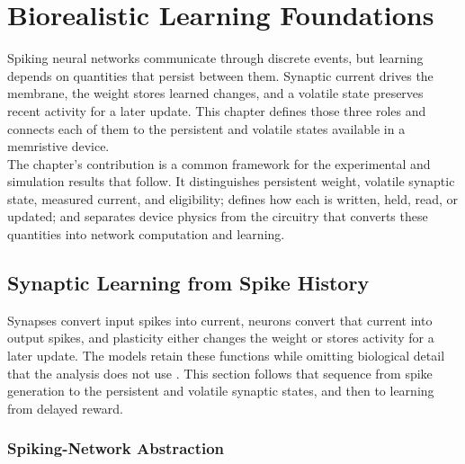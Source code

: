 
\chapter{Biorealistic Learning Foundations}\label{ch:foundations}

\noindent Spiking neural networks communicate through discrete events, but learning depends on quantities that
persist between them. Synaptic current drives the membrane, the weight stores learned changes, and a volatile state
preserves recent activity for a later update. This chapter defines those three roles and connects each of them to the
persistent and volatile states available in a memristive device.\\

\noindent The chapter's contribution is a common framework for the experimental and simulation results that follow.
It distinguishes persistent weight, volatile synaptic state, measured current, and eligibility; defines how each is
written, held, read, or updated; and separates device physics from the circuitry that converts these quantities into
network computation and learning.

\section[Synaptic Learning from Spike History]{Synaptic Learning from Spike History}\label{sec:spike-history}

\noindent Synapses convert input spikes into current, neurons convert that current into output spikes, and plasticity
either changes the weight or stores activity for a later update. The models retain these functions while omitting
biological detail that the analysis does not use \cite{kandel2000principles}. This section follows that sequence from
spike generation to the persistent and volatile synaptic states, and then to learning from delayed reward.

\subsection[Spiking-Network Abstraction]{Spiking-Network Abstraction}\label{subsec:neuronal-modelling}

